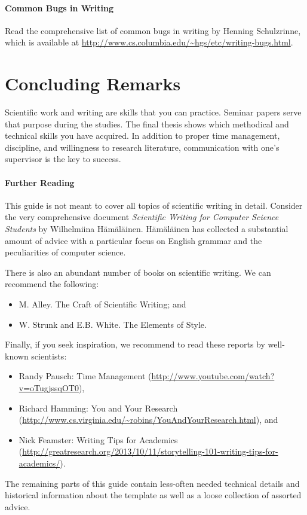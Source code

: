 \paragraph{Common Bugs in Writing}
\label{par:commonbugs}
Read the comprehensive list of common bugs in writing by Henning Schulzrinne, which is available at \url{http://www.cs.columbia.edu/~hgs/etc/writing-bugs.html}.

\section{Concluding Remarks}

Scientific work and writing are skills that you can practice. Seminar papers serve that purpose during the studies. The final thesis shows which methodical and technical skills you have acquired. In addition to proper time management, discipline, and willingness to research literature, communication with one's supervisor is the key to success.

\paragraph{Further Reading}

This guide is not meant to cover all topics of scientific writing in detail. Consider the very comprehensive document \emph{Scientific Writing for Computer Science Students} by Wilhelmiina Hämäläinen.%
Hämäläinen has collected a substantial amount of advice with a particular focus on English grammar and the peculiarities of computer science.

There is also an abundant number of books on scientific writing. We can recommend the following:
\begin{itemize}
\item M. Alley. The Craft of Scientific Writing; and
\item W. Strunk and E.B. White. The Elements of Style.
\end{itemize}

Finally, if you seek inspiration, we recommend to read these reports by well-known scientists:
\begin{itemize}
\item Randy Pausch: Time Management (\url{http://www.youtube.com/watch?v=oTugjssqOT0}),
\item Richard Hamming: You and Your Research (\url{http://www.cs.virginia.edu/~robins/YouAndYourResearch.html}), and
\item Nick Feamster: Writing Tips for Academics (\url{http://greatresearch.org/2013/10/11/storytelling-101-writing-tips-for-academics/}).
\end{itemize}

The remaining parts of this guide contain less-often needed technical details and historical information about the template as well as a loose collection of assorted advice.